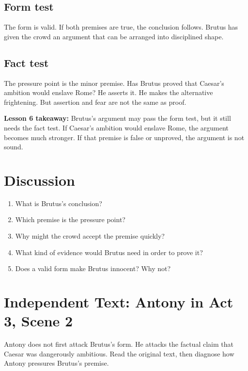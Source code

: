 \documentclass[12pt]{article}
\newcommand{\focusbox}[1]{\par\vspace{0.35em}\noindent\begingroup\setlength{\fboxsep}{6pt}\colorbox{gray!12}{\begin{minipage}{\dimexpr\linewidth-2\fboxsep\relax}#1\end{minipage}}\endgroup\par\vspace{0.45em}}
\begin{document}
\subsection*{Form test}
The form is valid. If both premises are true, the conclusion follows. Brutus has given the crowd an argument that can be arranged into disciplined shape.

\subsection*{Fact test}
The pressure point is the minor premise. Has Brutus proved that Caesar's ambition would enslave Rome? He asserts it. He makes the alternative frightening. But assertion and fear are not the same as proof.

\focusbox{\textbf{Lesson 6 takeaway:} Brutus's argument may pass the form test, but it still needs the fact test. If Caesar's ambition would enslave Rome, the argument becomes much stronger. If that premise is false or unproved, the argument is not sound.}

\section*{Discussion}
\begin{enumerate}[leftmargin=*]
\item What is Brutus's conclusion?
\item Which premise is the pressure point?
\item Why might the crowd accept the premise quickly?
\item What kind of evidence would Brutus need in order to prove it?
\item Does a valid form make Brutus innocent? Why not?
\end{enumerate}

\section*{Independent Text: Antony in Act 3, Scene 2}
Antony does not first attack Brutus's form. He attacks the factual claim that Caesar was dangerously ambitious. Read the original text, then diagnose how Antony pressures Brutus's premise.
\end{document}
